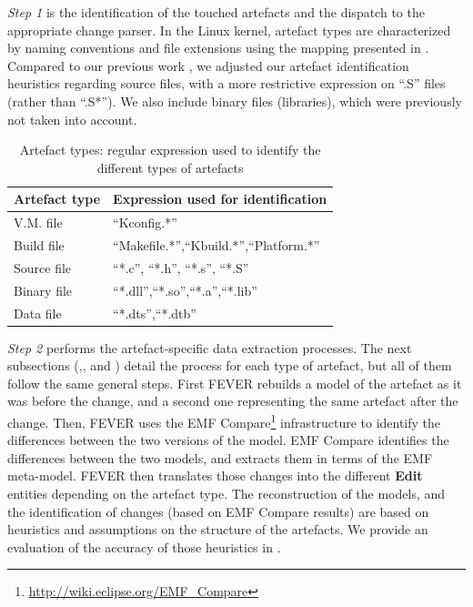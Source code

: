\textit{Step 1} is the identification of the touched artefacts and the dispatch to the appropriate change parser.
In the Linux kernel, artefact types are characterized by naming conventions and file extensions using the mapping presented in .
Compared to our previous work \citep{dintzner_fever:_2016}, we adjusted our artefact identification heuristics regarding source files, with a more restrictive expression on ``.S'' files (rather than ``.S*'').
We also include binary files (libraries), which were previously not taken into account.

\begin{table}[h]
\centering
{
\begin{tabular}{|l|l|}
\hline
Artefact type & Expression used for identification\\
\hline
V.M. file	& ``Kconfig.*'' \\
Build file	& ``Makefile.*'',``Kbuild.*'',``Platform.*'' \\
Source file & ``*.c'', ``*.h'', ``*.s'', ``*.S''\\
Binary file & ``*.dll'',``*.so'',``*.a'',``*.lib''\\
Data file	& ``*.dts'',``*.dtb''\\
\hline
\end{tabular}
}
\caption{Artefact types: regular expression used to identify the different types of artefacts}
\label{file_heuristics}
\end{table}

\textit{Step 2} performs the artefact-specific data extraction processes. 
The next subsections (,, and ) 
detail  the process for each type of artefact, but all of them follow the same general steps.
First FEVER rebuilds a model of the artefact as it was before the change, 
and a second one representing the same artefact after the change.
Then, FEVER uses the EMF Compare\footnote{\url{http://wiki.eclipse.org/EMF\_Compare}} infrastructure to identify 
the differences between the two versions of the model.
EMF Compare identifies the differences between the two models, and extracts them in terms of the EMF meta-model.
FEVER then translates those changes into the different \textbf{Edit} entities depending on the artefact type.
The reconstruction of the models, and the identification of changes (based on EMF Compare results)
are based on heuristics and assumptions on the structure of the artefacts.
We provide an evaluation of the accuracy of those heuristics in .

